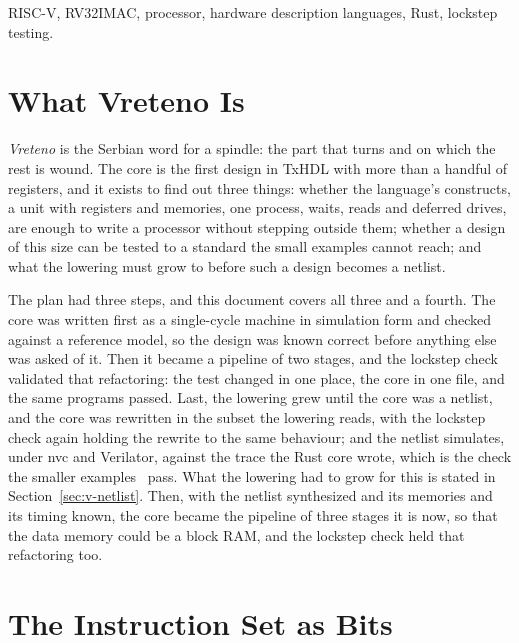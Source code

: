 \documentclass[journal,onecolumn,9pt]{IEEEtran}
\begin{document}
\begin{IEEEkeywords}
RISC-V, RV32IMAC, processor, hardware description languages, Rust,
lockstep testing.
\end{IEEEkeywords}

{\footnotesize\tableofcontents}

\section{What Vreteno Is}
\label{sec:v-what}

\emph{Vreteno} is the Serbian word for a spindle: the part that turns
and on which the rest is wound. The core is the first design in TxHDL
with more than a handful of registers, and it exists to find out three
things: whether the language's constructs, a unit with registers and
memories, one process, waits, reads and deferred drives, are enough to
write a processor without stepping outside them; whether a design of
this size can be tested to a standard the small examples cannot reach;
and what the lowering must grow to before such a design becomes a
netlist.

The plan had three steps, and this document covers all three and a
fourth. The core was written first as a single-cycle machine in
simulation form and checked against a reference model, so the design
was known correct before anything else was asked of it. Then it
became a pipeline of two stages, and the lockstep check validated
that refactoring: the test changed in one place, the core in
one file, and the same programs passed. Last, the lowering
grew until the core was a netlist, and the core was rewritten in the
subset the lowering reads, with the lockstep check again holding the
rewrite to the same behaviour; and the netlist simulates, under nvc
and Verilator, against the trace the Rust core wrote, which is the check the smaller
examples~\cite{examples} pass. What the lowering had to grow for
this is stated in Section~\ref{sec:v-netlist}. Then, with the
netlist synthesized and its memories and its timing known, the core
became the pipeline of three stages it is now, so that the data
memory could be a block RAM, and the lockstep check held that
refactoring too.

\section{The Instruction Set as Bits}
\label{sec:v-isa}
\end{document}
